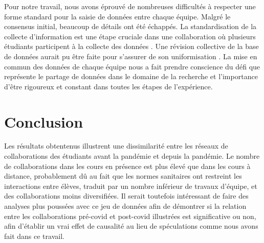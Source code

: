 \documentclass[12pt]{article}
\begin{document}
\par Pour notre travail, nous avons éprouvé de nombreuses difficultés à respecter une forme standard pour la saisie de données entre chaque équipe. Malgré le consensus initial, beaucoup de détails ont été échappés. La standardisation de la collecte d’information est une étape cruciale dans une collaboration où plusieurs étudiants participent à la collecte des données \citep{desquilbet_vers_2019}. Une révision collective de la base de données aurait pu être faite pour s’assurer de son uniformisation \citep{baker2016}. La mise en commun des données de chaque équipe nous a fait prendre conscience du défi que représente le partage de données dans le domaine de la recherche et l’importance d’être rigoureux et constant dans toutes les étapes de l’expérience.

\section*{\large Conclusion\vspace{-0.1cm}}
Les résultats obtentenus illustrent une dissimilarité entre les réseaux de collaborations des étudiants avant la pandémie et depuis la pandémie. Le nombre de collaborations dans les cours en présence est plus élevé que dans les cours à distance, probablement dû au fait que les normes sanitaires ont restreint les interactions entre élèves, traduit par un nombre inférieur de travaux d’équipe, et des collaborations moins diversifiées. Il serait toutefois intéressant de faire des analyses plus poussées avec ce jeu de données afin de démontrer si la relation entre les collaborations pré-covid et post-covid illustrées est significative ou non, afin d’établir un vrai effet de causalité au lieu de spéculations comme nous avons fait dans ce travail.


\nocite{*}


\end{document}
